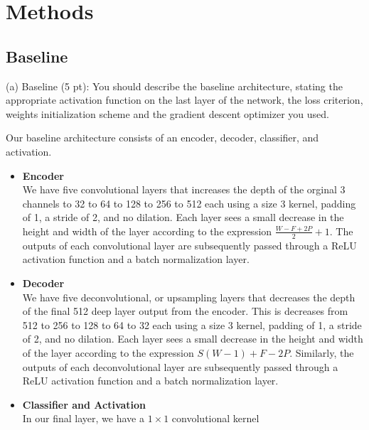 \section*{Methods}

\subsection*{Baseline}
(a) Baseline (5 pt): You should describe the baseline architecture, stating the appropriate activation function on the last layer of the network, the loss criterion, weights initialization scheme and the gradient descent optimizer you used.

Our baseline architecture consists of an encoder, decoder, classifier, and activation. 
\begin{itemize}
  \item[] \textbf{Encoder} \\
    We have five convolutional layers that increases the depth of the orginal 3 channels to 32 to 64 to 128 to 256 to 512 each using a size 3 kernel, padding of 1, a stride of 2, and no dilation. Each layer sees a small decrease in the height and width of the layer according to the expression $\frac{W - F + 2P}{2} + 1$. The outputs of each convolutional layer are subsequently passed through a ReLU activation function and a batch normalization layer.
  \item[] \textbf{Decoder} \\
    We have five deconvolutional, or upsampling layers that decreases the depth of the final 512 deep layer output from the encoder. This is decreases from 512 to 256 to 128 to 64 to 32 each using a size 3 kernel, padding of 1, a stride of 2, and no dilation. Each layer sees a small decrease in the height and width of the layer according to the expression $S(W - 1) + F - 2P$. Similarly, the outputs of each deconvolutional layer are subsequently passed through a ReLU activation function and a batch normalization layer.
  \item[] \textbf{Classifier and Activation} \\
    In our final layer, we have a $1 \times 1$ convolutional kernel 
\end{itemize}

